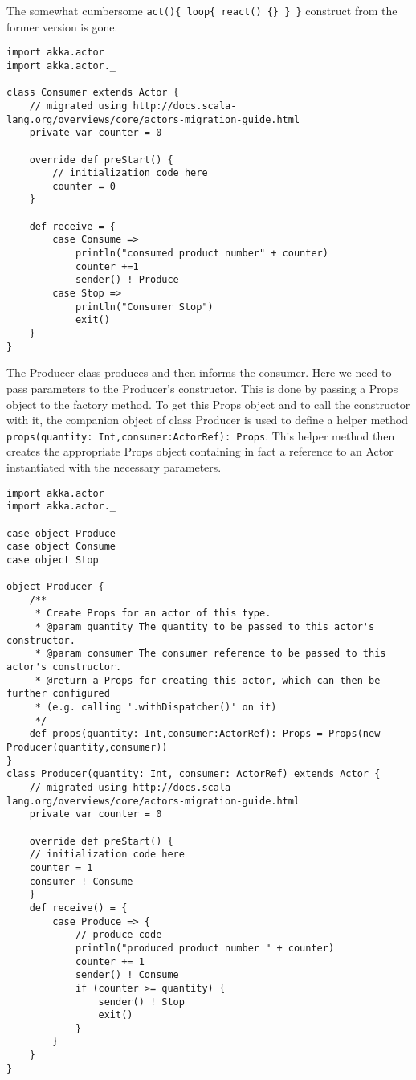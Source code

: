 \documentclass[
	a4paper,					10pt,							twoside,					openright,				notitlepage,			parskip=half,			]{scrreprt}
\begin{document}
The somewhat cumbersome \verb|act(){ loop{ react() {} } }| construct
from the former version is gone.
\begin{lstlisting}
import akka.actor
import akka.actor._

class Consumer extends Actor {
	// migrated using http://docs.scala-lang.org/overviews/core/actors-migration-guide.html
	private var counter = 0

	override def preStart() {
		// initialization code here
		counter = 0
	}
	
	def receive = {
		case Consume => 
			println("consumed product number" + counter)
			counter +=1
			sender() ! Produce
		case Stop =>
			println("Consumer Stop")
			exit()
	}
}
\end{lstlisting}
The Producer class produces and then informs the consumer. Here we need to pass parameters 
to the Producer's constructor. This is done by passing a Props object to the factory method.
To get this Props object and to call the constructor with it, the companion object of class Producer
is used to define a helper method \verb|props(quantity: Int,consumer:ActorRef): Props|. This
helper method then creates the appropriate Props object containing in fact a reference to an Actor
instantiated with the necessary parameters. 
\begin{lstlisting}
import akka.actor
import akka.actor._

case object Produce
case object Consume
case object Stop

object Producer {
  	/**
	 * Create Props for an actor of this type.
	 * @param quantity The quantity to be passed to this actor's constructor.
	 * @param consumer The consumer reference to be passed to this actor's constructor.
	 * @return a Props for creating this actor, which can then be further configured
	 * (e.g. calling '.withDispatcher()' on it)
	 */
	def props(quantity: Int,consumer:ActorRef): Props = Props(new Producer(quantity,consumer))
}
class Producer(quantity: Int, consumer: ActorRef) extends Actor {
	// migrated using http://docs.scala-lang.org/overviews/core/actors-migration-guide.html
	private var counter = 0

	override def preStart() {
	// initialization code here
	counter = 1
	consumer ! Consume
	}
	def receive() = {
		case Produce => {
			// produce code
			println("produced product number " + counter)
			counter += 1
			sender() ! Consume
			if (counter >= quantity) {
				sender() ! Stop
				exit()
			}
		}
	} 
}
\end{lstlisting}
\end{document}
